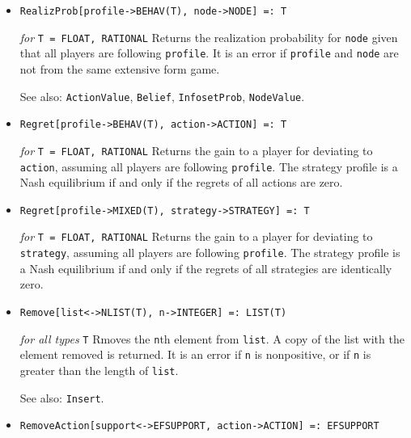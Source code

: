 \begin{itemize}
\item
\protect \large \begin{verbatim}
RealizProb[profile->BEHAV(T), node->NODE] =: T
\end{verbatim}\normalsize

{\it for} {\tt T = FLOAT, RATIONAL}
\bd
Returns the realization probability for \verb+node+ given that all players
are following \verb+profile+.  It is an error if \verb+profile+ and
\verb+node+ are not from the same extensive form game.
\item [See also:] \verb+ActionValue+, \verb+Belief+, \verb+InfosetProb+,
\verb+NodeValue+.
\ed

\item
\protect \large \begin{verbatim}
Regret[profile->BEHAV(T), action->ACTION] =: T
\end{verbatim} \normalsize

{\it for} {\tt T = FLOAT, RATIONAL}
\bd
Returns the gain to a player for deviating to \verb+action+, assuming
all players are following \verb+profile+.  The strategy profile is
a Nash equilibrium if and only if the regrets of all actions are zero.
\ed

\item
\protect \large \begin{verbatim}
Regret[profile->MIXED(T), strategy->STRATEGY] =: T
\end{verbatim} \normalsize

{\it for} {\tt T = FLOAT, RATIONAL}
\bd
Returns the gain to a player for deviating to \verb+strategy+, assuming
all players are following \verb+profile+.  The strategy profile is
a Nash equilibrium if and only if the regrets of all strategies are
identically zero.
\ed

\item
\protect \large \begin{verbatim}
Remove[list<->NLIST(T), n->INTEGER] =: LIST(T)
\end{verbatim}\normalsize

{\it for all types} {\tt T}
\bd
Rmoves the \verb+n+th element from \verb+list+.  A copy of the list
with the element removed is returned.  It is an error if \verb+n+
is nonpositive, or if \verb+n+ is greater than the length of \verb+list+.
\item [See also:] \verb+Insert+.
\ed

\item
\protect \large \begin{verbatim}
RemoveAction[support<->EFSUPPORT, action->ACTION] =: EFSUPPORT
\end{verbatim}\normalsize


\end{itemize}
